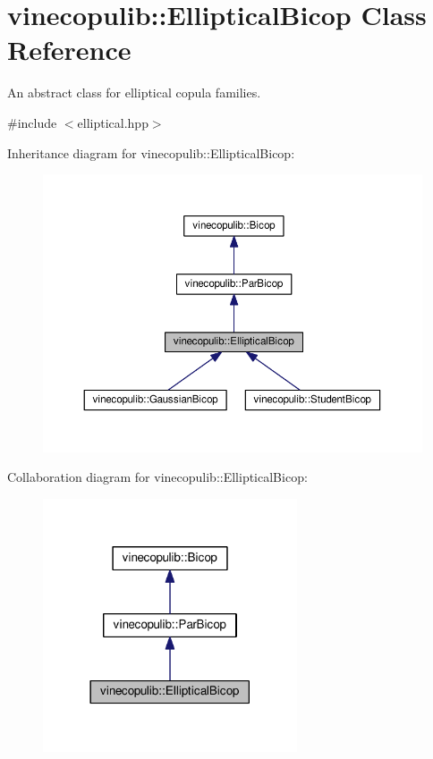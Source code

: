 \hypertarget{classvinecopulib_1_1_elliptical_bicop}{}\section{vinecopulib\+:\+:Elliptical\+Bicop Class Reference}
\label{classvinecopulib_1_1_elliptical_bicop}


An abstract class for elliptical copula families.  




{\ttfamily \#include $<$elliptical.\+hpp$>$}



Inheritance diagram for vinecopulib\+:\+:Elliptical\+Bicop\+:\nopagebreak
\begin{figure}[H]
\begin{center}
\leavevmode
\includegraphics[width=350pt]{classvinecopulib_1_1_elliptical_bicop__inherit__graph}
\end{center}
\end{figure}


Collaboration diagram for vinecopulib\+:\+:Elliptical\+Bicop\+:\nopagebreak
\begin{figure}[H]
\begin{center}
\leavevmode
\includegraphics[width=213pt]{classvinecopulib_1_1_elliptical_bicop__coll__graph}
\end{center}
\end{figure}
